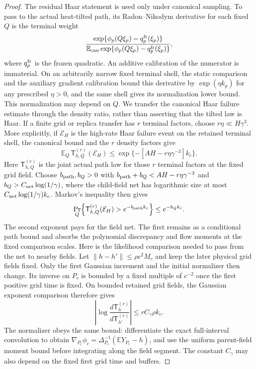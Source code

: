 \begin{proof}
The residual Haar statement is used only under canonical
sampling.  To pass to the actual heat-tilted path, its
Radon--Nikodym derivative for each fixed $Q$ is the terminal
weight
\[
 \frac{\exp\{\phi_p(Q\xi_p)-q_p^{\rm fr}(\xi_p)\}}
 {\mathbb E_{\rm can}
    \exp\{\phi_p(Q\xi_p)-q_p^{\rm fr}(\xi_p)\}},
\]
where $q_p^{\rm fr}$ is the frozen quadratic. An additive calibration of the
numerator is immaterial. On an arbitrarily narrow fixed terminal shell, the
static comparison and the auxiliary gradient calibration bound this derivative
by $\exp(\eta k_p)$ for any prescribed $\eta>0$, and the same shell gives its
normalization lower bound. This normalization may depend on $Q$. We transfer
the canonical Haar failure estimate through the density ratio, rather than
asserting that the tilted law is Haar. If a finite grid or replica transfer
has $r$ terminal factors, choose $r\eta\ll H\gamma^3$. More explicitly, if
$\mathcal E_H$ is the high-rate Haar failure event on the retained terminal
shell, the canonical bound and the $r$ density factors give
\[
 \mathbb E_Q\,\mathsf T_{h,Q}^{(r)}(\mathcal E_H)
 \le \exp\{-[AH-r\eta\gamma^{-3}]k_c\}.
\]
Here $\mathsf T_{h,Q}^{(r)}$ is the joint actual path law for those
$r$ terminal factors at the fixed grid field.
Choose $b_{\rm path},b_Q>0$ with
$b_{\rm path}+b_Q<AH-r\eta\gamma^{-3}$ and
$b_Q>C_{\rm net}\log(1/\gamma)$, where the child-field net has logarithmic
size at most $C_{\rm net}\log(1/\gamma)k_c$. Markov's inequality then gives
\[
 \Pr_Q\!\left\{\mathsf T_{h,Q}^{(r)}(\mathcal E_H)
                 >e^{-b_{\rm path}k_c}\right\}
 \le e^{-b_Qk_c}.
\]
The second exponent pays for the field net. The first remains as a
conditional path bound and absorbs the polynomial discrepancy and flow
moments at the fixed comparison scales. Here is the likelihood comparison
needed to pass from the net to nearby fields. Let
$\|h-h'\|\le\rho c^2M_c$ and keep the later physical grid fields fixed.
Only the first Gaussian increment and the initial normalizer then change.
Its inverse on $P_c$ is bounded by a fixed multiple of $c^{-2}$ once the
first positive grid time is fixed. On bounded retained grid fields, the
Gaussian exponent comparison therefore gives
\[
 \left|\log\frac{d\mathsf T_h^{(r)}}{d\mathsf T_{h'}^{(r)}}\right|
       \le rC_\gamma\rho k_c.
\]
The normalizer obeys the same bound: differentiate the exact full-interval
convolution to obtain
$\nabla_{P_c}\phi_c=\Delta_{P_c}^{-1}(\mathbb E Y_{P_c}-h)$,
and use the uniform parent-field moment bound before integrating along
the field segment. The constant $C_\gamma$ may also depend on the fixed
first grid time and buffers.


\end{proof}
